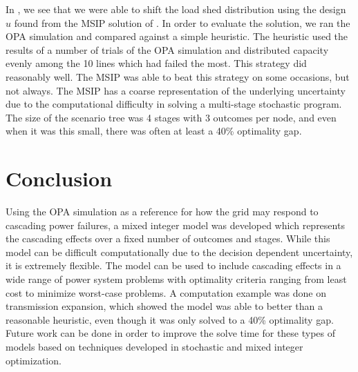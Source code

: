 In , we see that we were able to shift the load shed distribution using the design $u$ found from the MSIP solution of .  In order to evaluate the solution, we ran the OPA simulation and compared against a simple heuristic.  The heuristic used the results of a number of trials of the OPA simulation and distributed capacity evenly among the 10 lines which had failed the most.  This strategy did reasonably well.  The MSIP was able to beat this strategy on some occasions, but not always.  The MSIP has a coarse representation of the underlying uncertainty due to the computational difficulty in solving a multi-stage stochastic program.  The size of the scenario tree was 4 stages with 3 outcomes per node, and even when it was this small, there was often at least a 40\% optimality gap.


\section{Conclusion}

Using the OPA simulation as a reference for how the grid may respond to cascading power failures, a mixed integer model was developed which represents the cascading effects over a fixed number of outcomes and stages.  While this model can be difficult computationally due to the decision dependent uncertainty, it is extremely flexible.  The model can be used to include cascading effects in a wide range of power system problems with optimality criteria ranging from least cost to minimize worst-case problems.  A computation example was done on transmission expansion, which showed the model was able to better than a reasonable heuristic, even though it was only solved to a 40\% optimality gap.  Future work can be done in order to improve the solve time for these types of models based on techniques developed in stochastic and mixed integer optimization.


